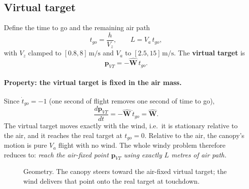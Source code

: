 \documentclass[11pt,a4paper]{article}
\newcommand{\vect}[1]{\mathbf{#1}}
\begin{document}
\subsection{Virtual target}
Define the time to go and the remaining air path
\begin{equation}
  t_{go} = \frac{h}{V_z}, \qquad L = V_a\, t_{go},
\end{equation}
with $V_z$ clamped to $[0.8, 8]\,\si{\meter\per\second}$ and $V_a$ to
$[2.5, 15]\,\si{\meter\per\second}$. The \textbf{virtual target} is
\begin{equation}
  \vect p_{VT} = -\hat{\vect W}\, t_{go}.
\end{equation}

\paragraph{Property: the virtual target is fixed in the air mass.}
Since $\dot t_{go} = -1$ (one second of flight removes one second of time to
go),
\begin{equation}
  \frac{d\vect p_{VT}}{dt} = -\hat{\vect W}\,\dot t_{go} = \hat{\vect W}.
\end{equation}
The virtual target moves exactly with the wind, i.e.\ it is stationary
relative to the air, and it reaches the real target at $t_{go} = 0$.
Relative to the air, the canopy's motion is pure $V_a$ flight with no wind.
The whole windy problem therefore reduces to: \emph{reach the air-fixed
point $\vect p_{VT}$ using exactly $L$ metres of air path.}

\begin{figure}[H]
\centering
{}
\caption{Geometry. The canopy steers toward the air-fixed virtual target; the
wind delivers that point onto the real target at touchdown.}
\end{figure}
\end{document}
